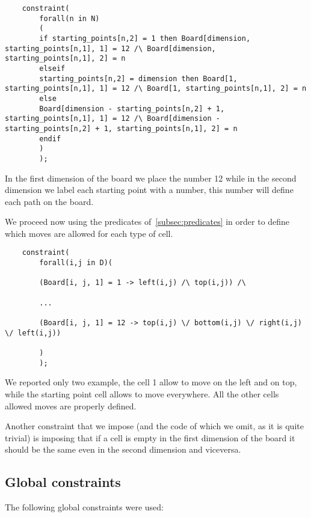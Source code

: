 \begin{verbatim}
    constraint(
        forall(n in N)
        (
        if starting_points[n,2] = 1 then Board[dimension, starting_points[n,1], 1] = 12 /\ Board[dimension, starting_points[n,1], 2] = n
        elseif
        starting_points[n,2] = dimension then Board[1, starting_points[n,1], 1] = 12 /\ Board[1, starting_points[n,1], 2] = n
        else
        Board[dimension - starting_points[n,2] + 1, starting_points[n,1], 1] = 12 /\ Board[dimension - starting_points[n,2] + 1, starting_points[n,1], 2] = n
        endif
        )
        );
\end{verbatim}
In the first dimension of the board we place the number 12 while in the second dimension we label each starting point with a number, this number will define each path on the board.

We proceed now using the predicates of~\ref{subsec:predicates} in order to define which moves are allowed for each type of cell.


\begin{verbatim}
    constraint(
        forall(i,j in D)(
        
        (Board[i, j, 1] = 1 -> left(i,j) /\ top(i,j)) /\
        
        ...
        
        (Board[i, j, 1] = 12 -> top(i,j) \/ bottom(i,j) \/ right(i,j) \/ left(i,j))
        
        )
        );
\end{verbatim}

We reported only two example, the cell 1 allow to move on the left and on top, while the starting point cell allows to move everywhere. All the other cells allowed moves are properly defined.

Another constraint that we impose (and the code of which we omit, as it is quite trivial) is imposing that if a cell is empty in the first dimension of the board it should be the same even in the second dimension and viceversa.

\subsection{Global constraints}
The following global constraints were used:


